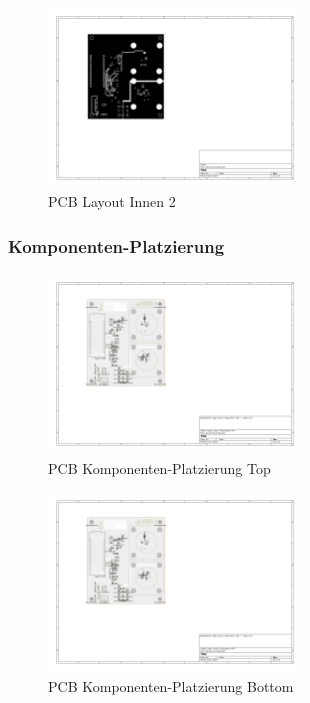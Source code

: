 \documentclass[11pt,a4paper,hidelinks]{article}
\begin{document}
\begin{figure}[H]
    \centering
    \includegraphics[trim=130 220 450 80, clip, width=0.6\textwidth]{attachments/pcb_In2_Cu.pdf}
    \caption{PCB Layout Innen 2}\label{fig:pcb_in2_cu}
\end{figure}

\subsubsection{Komponenten-Platzierung}

\begin{figure}[H]
    \centering
    \includegraphics[page=1, trim=120 220 450 80, clip, width=0.6\textwidth]{attachments/pcb_placement.pdf}
    \caption{PCB Komponenten-Platzierung Top}\label{fig:pcb_placement_1}
\end{figure}

\begin{figure}[H]
    \centering
    \includegraphics[page=2, trim=450 220 120 80, clip, width=0.6\textwidth]{attachments/pcb_placement.pdf}
    \caption{PCB Komponenten-Platzierung Bottom}\label{fig:pcb_placement_2}
\end{figure}
\end{document}
